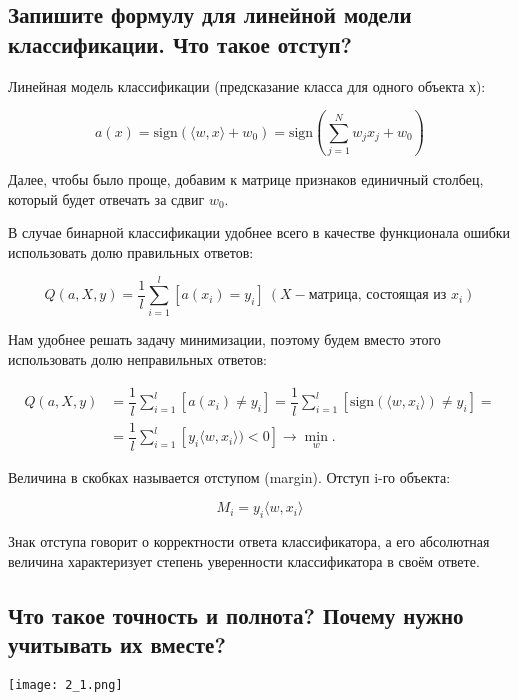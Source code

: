 \subsection{Запишите формулу для линейной модели классификации. Что такое отступ?}

Линейная модель классификации (предсказание класса для одного объекта х):

$$a(x) = \text{sign}(\langle w, x\rangle + w_0) = \text{sign}\left(\sum\limits_{j=1}^Nw_jx_j + w_0\right)$$

Далее, чтобы было проще,  добавим к матрице признаков единичный столбец, который будет отвечать за сдвиг $w_0$.

В случае бинарной классификации удобнее всего в качестве функционала ошибки использовать долю правильных ответов:

$$Q(a, X, y) = \dfrac{1}{l}\sum\limits_{i=1}^l[a(x_i) = y_i]\ (X - \text{матрица, состоящая из } x_i)$$

Нам удобнее решать задачу минимизации, поэтому будем вместо этого использовать долю неправильных ответов:

$$\begin{array}{rl}Q(a, X, y) &= \dfrac{1}{l}\sum\limits_{i=1}^l[a(x_i) \neq y_i] = \dfrac{1}{l}\sum\limits_{i=1}^l[\text{sign}(\langle w, x_i\rangle) \neq y_i] =\\&= \dfrac{1}{l}\sum\limits_{i=1}^l[y_i\langle w, x_i\rangle) < 0] \longrightarrow \min\limits_w.\end{array}$$

Величина в скобках называется отступом (margin). Отступ i-го объекта:

$$M_i = y_i\langle w, x_i\rangle$$

Знак отступа говорит о корректности ответа классификатора, а его абсолютная величина характеризует степень уверенности классификатора в своём ответе.















\subsection{Что такое точность и полнота? Почему нужно учитывать их вместе?}


\begin{center}
    \texttt{[image: 2\_1.png]}
\end{center}

